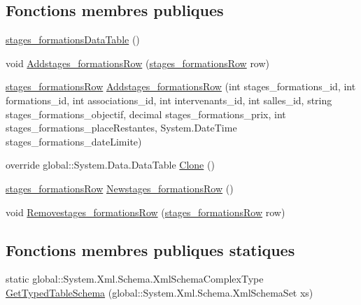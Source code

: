 \subsection*{Fonctions membres publiques}
\begin{DoxyCompactItemize}
\item 
\hyperlink{classforma_1_1formadb_data_set_1_1stages__formations_data_table_a8614ea37231a8ec152b329f6fc9898b9}{stages\+\_\+formations\+Data\+Table} ()
\item 
void \hyperlink{classforma_1_1formadb_data_set_1_1stages__formations_data_table_adde69a16f7f381fe5fc86391d3433482}{Addstages\+\_\+formations\+Row} (\hyperlink{classforma_1_1formadb_data_set_1_1stages__formations_row}{stages\+\_\+formations\+Row} row)
\item 
\hyperlink{classforma_1_1formadb_data_set_1_1stages__formations_row}{stages\+\_\+formations\+Row} \hyperlink{classforma_1_1formadb_data_set_1_1stages__formations_data_table_a51be175199dd04e70d8641ad270903a1}{Addstages\+\_\+formations\+Row} (int stages\+\_\+formations\+\_\+id, int formations\+\_\+id, int associations\+\_\+id, int intervenants\+\_\+id, int salles\+\_\+id, string stages\+\_\+formations\+\_\+objectif, decimal stages\+\_\+formations\+\_\+prix, int stages\+\_\+formations\+\_\+place\+Restantes, System.\+Date\+Time stages\+\_\+formations\+\_\+date\+Limite)
\item 
override global\+::\+System.\+Data.\+Data\+Table \hyperlink{classforma_1_1formadb_data_set_1_1stages__formations_data_table_aea1aae1b146414e4209d9946a3fcc40f}{Clone} ()
\item 
\hyperlink{classforma_1_1formadb_data_set_1_1stages__formations_row}{stages\+\_\+formations\+Row} \hyperlink{classforma_1_1formadb_data_set_1_1stages__formations_data_table_afcb4066516ce26a9ebb71e8d5e36b5fc}{Newstages\+\_\+formations\+Row} ()
\item 
void \hyperlink{classforma_1_1formadb_data_set_1_1stages__formations_data_table_a1a2905eceec79cb655bc318375314d6d}{Removestages\+\_\+formations\+Row} (\hyperlink{classforma_1_1formadb_data_set_1_1stages__formations_row}{stages\+\_\+formations\+Row} row)
\end{DoxyCompactItemize}
\subsection*{Fonctions membres publiques statiques}
\begin{DoxyCompactItemize}
\item 
static global\+::\+System.\+Xml.\+Schema.\+Xml\+Schema\+Complex\+Type \hyperlink{classforma_1_1formadb_data_set_1_1stages__formations_data_table_ab010340b62be0f7ce246fb7dfe230f8b}{Get\+Typed\+Table\+Schema} (global\+::\+System.\+Xml.\+Schema.\+Xml\+Schema\+Set xs)
\end{DoxyCompactItemize}
